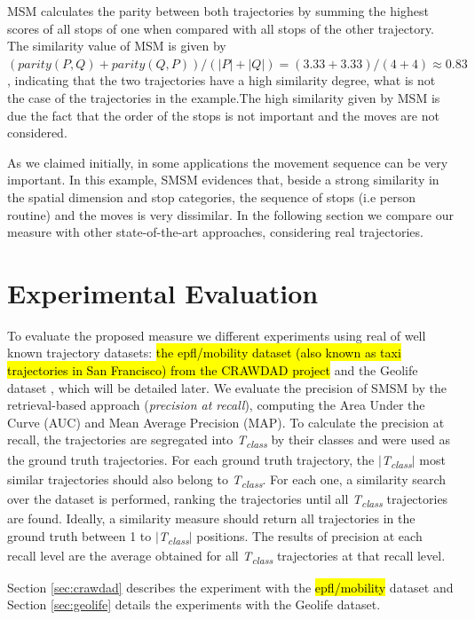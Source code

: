 \documentclass[12pt]{article}
\begin{document}
MSM calculates the parity between both trajectories by summing the highest scores of all stops of one when compared with all stops of the other trajectory. The similarity value of MSM is given by $(parity(P, Q) + parity(Q, P)) / (|P| + |Q|) = (3.33 + 3.33) / (4 + 4) \approx 0.83 $, indicating that the two trajectories have a high similarity degree, what is not the case of the trajectories in the example.The high similarity given by MSM is due the fact that the order of the stops is not important and the moves are not considered.

As we claimed initially, in some applications the movement sequence can be very important. In this example, SMSM evidences that, beside a strong similarity in the spatial dimension and stop categories, the sequence of stops (i.e person routine) and the moves is very dissimilar. In the following section we compare our measure with other state-of-the-art approaches, considering real trajectories.

\section{Experimental Evaluation} \label{sec:experiments}
To evaluate the proposed measure we different experiments using real of well known trajectory datasets: \hl{the epfl/mobility dataset (also known as taxi trajectories in San Francisco) from the CRAWDAD project} \citep{epfl-mobility-20090224} and the Geolife dataset \citep{zheng2009mining}, which will be detailed later. We evaluate the precision of SMSM by the retrieval-based approach (\textit{precision at recall}), computing the Area Under the Curve (AUC) and Mean Average Precision (MAP). To calculate the precision at recall, the trajectories are segregated into \textit{T\textsubscript{class}} by their classes and were used as the ground truth trajectories. For each ground truth trajectory, the $|$\textit{T\textsubscript{class}}$|$ most similar trajectories should also belong to \textit{T\textsubscript{class}}. For each one, a similarity search over the dataset is performed, ranking the trajectories until all \textit{T\textsubscript{class}} trajectories are found. Ideally, a similarity measure should return all trajectories in the ground truth between 1 to $|$\textit{T\textsubscript{class}}$|$ positions. The results of precision at each recall level are the average obtained for all \textit{T\textsubscript{class}} trajectories at that recall level.

Section \ref{sec:crawdad} describes the experiment with the \hl{epfl/mobility} dataset and Section \ref{sec:geolife} details the experiments with the Geolife dataset.
\end{document}
